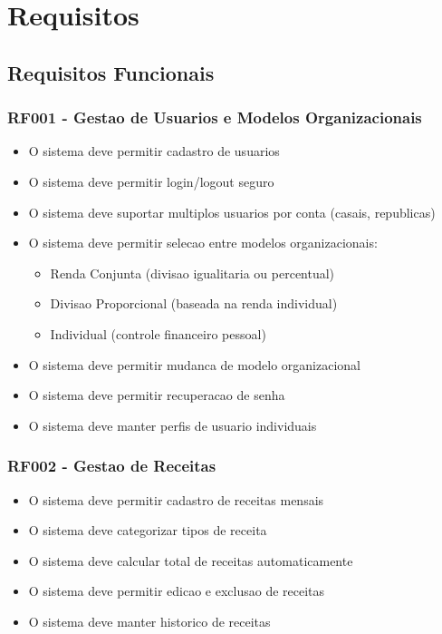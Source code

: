 \section{Requisitos}

\subsection{Requisitos Funcionais}

\subsubsection{RF001 - Gestao de Usuarios e Modelos Organizacionais}
\begin{itemize}
    \item O sistema deve permitir cadastro de usuarios
    \item O sistema deve permitir login/logout seguro
    \item O sistema deve suportar multiplos usuarios por conta (casais, republicas)
    \item O sistema deve permitir selecao entre modelos organizacionais:
    \begin{itemize}
        \item Renda Conjunta (divisao igualitaria ou percentual)
        \item Divisao Proporcional (baseada na renda individual)
        \item Individual (controle financeiro pessoal)
    \end{itemize}
    \item O sistema deve permitir mudanca de modelo organizacional
    \item O sistema deve permitir recuperacao de senha
    \item O sistema deve manter perfis de usuario individuais
\end{itemize}

\subsubsection{RF002 - Gestao de Receitas}
\begin{itemize}
    \item O sistema deve permitir cadastro de receitas mensais
    \item O sistema deve categorizar tipos de receita
    \item O sistema deve calcular total de receitas automaticamente
    \item O sistema deve permitir edicao e exclusao de receitas
    \item O sistema deve manter historico de receitas
\end{itemize}

